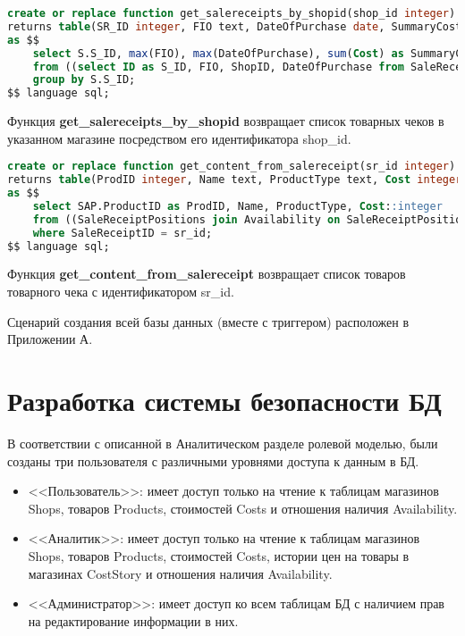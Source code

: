 \documentclass{bmstu}
\begin{document}
\begin{lstlisting}[language=sql, caption={Реализация хранимой функции get\_salereceipts\_by\_shopid}]
create or replace function get_salereceipts_by_shopid(shop_id integer)
returns table(SR_ID integer, FIO text, DateOfPurchase date, SummaryCost integer)
as $$
	select S.S_ID, max(FIO), max(DateOfPurchase), sum(Cost) as SummaryCost
	from ((select ID as S_ID, FIO, ShopID, DateOfPurchase from SaleReceipts where ShopID = shop_id) as SR join SaleReceiptPositions on SaleReceiptPositions.SaleReceiptID = SR.S_ID) as S join Costs on S.AvailabilityID = Costs.AvailabilityID
	group by S.S_ID;
$$ language sql;
\end{lstlisting}


Функция \textbf{get\_salereceipts\_by\_shopid} возвращает список товарных чеков в указанном магазине посредством его идентификатора shop\_id. 

\begin{lstlisting}[language=sql, caption={Реализация хранимой функции get\_content\_from\_salereceipt}]
create or replace function get_content_from_salereceipt(sr_id integer)
returns table(ProdID integer, Name text, ProductType text, Cost integer)
as $$
	select SAP.ProductID as ProdID, Name, ProductType, Cost::integer
	from ((SaleReceiptPositions join Availability on SaleReceiptPositions.AvailabilityID = Availability.ID) as SA join Products on Products.ID = SA.ProductID) as SAP join Costs on SAP.AvailabilityID = Costs.AvailabilityID
	where SaleReceiptID = sr_id;
$$ language sql;
\end{lstlisting}


Функция \textbf{get\_content\_from\_salereceipt} возвращает список товаров товарного чека с идентификатором sr\_id. 

Сценарий создания всей базы данных (вместе с триггером) расположен в Приложении А.

\section{Разработка системы безопасности БД}

В соответствии с описанной в Аналитическом разделе ролевой моделью, были созданы три пользователя с различными уровнями доступа к данным в БД.

\begin{itemize}
	\item <<Пользователь>>: имеет доступ только на чтение к таблицам магазинов Shops, товаров Products, стоимостей Costs и отношения наличия Availability.
	\item <<Аналитик>>: имеет доступ только на чтение к таблицам магазинов Shops, товаров Products, стоимостей Costs, истории цен на товары в магазинах CostStory и отношения наличия Availability.
	\item <<Администратор>>: имеет доступ ко всем таблицам БД с наличием прав на редактирование информации в них.
\end{itemize}
\end{document}
